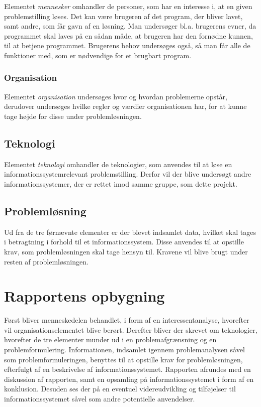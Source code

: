 Elementet \textit{mennesker} omhandler de personer, som har en interesse i, at en given problemstilling løses. 
Det kan være brugeren af det program, der bliver lavet, samt andre, som får gavn af en løsning.
Man undersøger bl.a. brugerens evner, da programmet skal laves på en sådan måde, at brugeren har den fornødne kunnen, til at betjene programmet.
Brugerens behov undersøges også, så man får alle de funktioner med, som er nødvendige for et brugbart program.


\subsubsection{Organisation}\label{subsec:organisation}

Elementet \textit{organisation} undersøges hvor og hvordan problemerne opstår, derudover undersøges hvilke regler og værdier organisationen har, for at kunne tage højde for disse under problemløsningen.


\subsection{Teknologi}\label{subsec:Teknologi}

Elementet \textit{teknologi} omhandler de teknologier, som anvendes til at løse en informationssystemrelevant problemstilling.
Derfor vil der blive undersøgt andre informationssystemer, der er rettet imod samme gruppe, som dette projekt.


\subsection{Problemløsning}
Ud fra de tre førnævnte elementer er der blevet indsamlet data, hvilket skal tages i betragtning i forhold til et informationssystem.
Disse anvendes til at opstille krav, som problemløsningen skal tage hensyn til.
Kravene vil blive brugt under resten af problemløsningen.


\section{Rapportens opbygning}\label{sec:rapportens-opbygning}

Først bliver menneskedelen behandlet, i form af en interessentanalyse, hvorefter vil organisationselementet blive berørt.
Derefter bliver der skrevet om teknologier, hvorefter de tre elementer munder ud i en problemafgrænsning og en problemformulering.
Informationen, indsamlet igennem problemanalysen såvel som problemformuleringen, benyttes til at opstille krav for problemløsningen, efterfulgt af en beskrivelse af informationssystemet. 
Rapporten afrundes med en diskussion af rapporten, samt en opsamling på informationssystemet i form af en konklusion. Desuden ses der på en eventuel videreudvikling og tilføjelser til informationssystemet såvel som andre potentielle anvendelser.